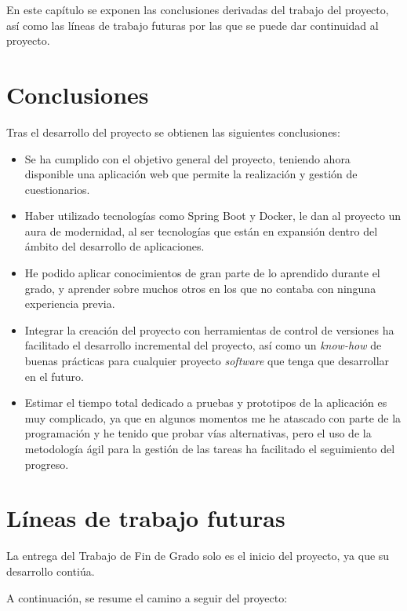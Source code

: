 
En este capítulo se exponen las conclusiones derivadas del trabajo del proyecto, así como las líneas de trabajo futuras por las que se puede dar continuidad al proyecto.

\section{Conclusiones}

Tras el desarrollo del proyecto se obtienen las siguientes conclusiones:

\begin{itemize}
	\item Se ha cumplido con el objetivo general del proyecto, teniendo ahora disponible una aplicación web que permite la realización y gestión de cuestionarios.
	\item Haber utilizado tecnologías como Spring Boot y Docker, le dan al proyecto un aura de modernidad, al ser tecnologías que están en expansión dentro del ámbito del desarrollo de aplicaciones.
	\item He podido aplicar conocimientos de gran parte de lo aprendido durante el grado, y aprender sobre muchos otros en los que no contaba con ninguna experiencia previa.
	\item Integrar la creación del proyecto con herramientas de control de versiones ha facilitado el desarrollo incremental del proyecto, así como un \textit{know-how} de buenas prácticas para cualquier proyecto \textit{software} que tenga que desarrollar en el futuro.
	\item Estimar el tiempo total dedicado a pruebas y prototipos de la aplicación es muy complicado, ya que en algunos momentos me he atascado con parte de la programación y he tenido que probar vías alternativas, pero el uso de la metodología ágil para la gestión de las tareas ha facilitado el seguimiento del progreso.
\end{itemize}

\section{Líneas de trabajo futuras}

La entrega del Trabajo de Fin de Grado solo es el inicio del proyecto, ya que su desarrollo contiúa.

A continuación, se resume el camino a seguir del proyecto:

